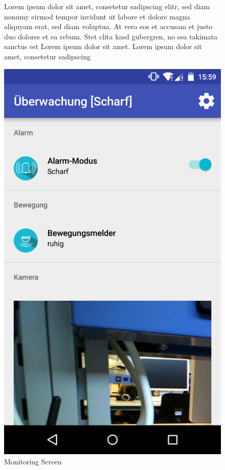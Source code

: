 \begin{figure}[htbp]
	\begin{minipage}{0.6\textwidth} 
Lorem ipsum dolor sit amet, consetetur sadipscing elitr, sed diam nonumy eirmod tempor invidunt ut labore et dolore magna aliquyam erat, sed diam voluptua. At vero eos et accusam et justo duo dolores et ea rebum. Stet clita kasd gubergren, no sea takimata sanctus est Lorem ipsum dolor sit amet. Lorem ipsum dolor sit amet, consetetur sadipscing 
	\end{minipage}
	\hfill
	\begin{minipage}{0.32\textwidth}
		\includegraphics[scale=0.12]{appendix/img/AppScreenshots/Screenshot5}
		\caption{Monitoring Screen}
		\label{fig:screenshot_5}
	\end{minipage}
\end{figure}

